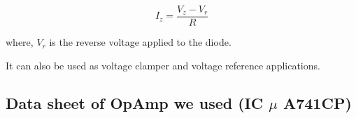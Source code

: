 \documentclass[14pt,a4paper]{extarticle}
\begin{document}
$$I_z = \frac{V_z - V_r}{R}$$

where, \(V_r\) is the reverse voltage applied to the diode.

It can also be used as voltage clamper and voltage reference applications.
\subsection{Data sheet of OpAmp we used (IC \(\mu\) A741CP)}
\label{sec:org62213d5}
\begin{figure}[H] 
\end{figure}  
\pagebreak
\end{document}
